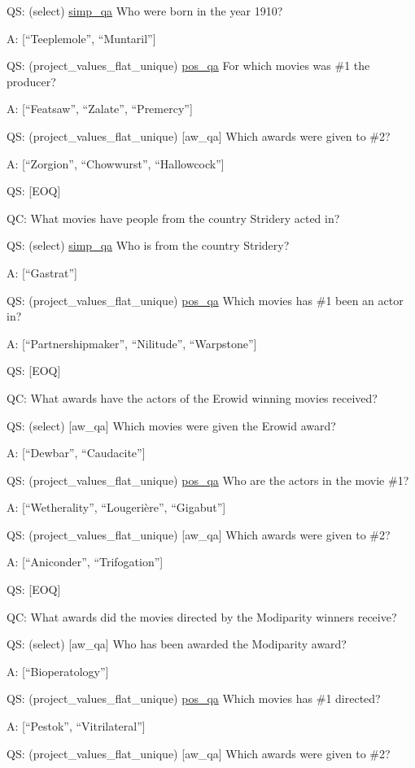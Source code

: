 \documentclass[
]{article}
\begin{document}
QS: (select) \hyperref[simp_qa]{simp\_qa} Who were born in the year
1910?

A: {[}``Teeplemole'', ``Muntaril''{]}

QS: (project\_values\_flat\_unique) \hyperref[pos_qa]{pos\_qa} For which
movies was \#1 the producer?

A: {[}``Featsaw'', ``Zalate'', ``Premercy''{]}

QS: (project\_values\_flat\_unique) {[}aw\_qa{]} Which awards were given
to \#2?

A: {[}``Zorgion'', ``Chowwurst'', ``Hallowcock''{]}

QS: {[}EOQ{]}

QC: What movies have people from the country Stridery acted in?

QS: (select) \hyperref[simp_qa]{simp\_qa} Who is from the country
Stridery?

A: {[}``Gastrat''{]}

QS: (project\_values\_flat\_unique) \hyperref[pos_qa]{pos\_qa} Which
movies has \#1 been an actor in?

A: {[}``Partnershipmaker'', ``Nilitude'', ``Warpstone''{]}

QS: {[}EOQ{]}

QC: What awards have the actors of the Erowid winning movies received?

QS: (select) {[}aw\_qa{]} Which movies were given the Erowid award?

A: {[}``Dewbar'', ``Caudacite''{]}

QS: (project\_values\_flat\_unique) \hyperref[pos_qa]{pos\_qa} Who are
the actors in the movie \#1?

A: {[}``Wetherality'', ``Lougerière'', ``Gigabut''{]}

QS: (project\_values\_flat\_unique) {[}aw\_qa{]} Which awards were given
to \#2?

A: {[}``Aniconder'', ``Trifogation''{]}

QS: {[}EOQ{]}

QC: What awards did the movies directed by the Modiparity winners
receive?

QS: (select) {[}aw\_qa{]} Who has been awarded the Modiparity award?

A: {[}``Bioperatology''{]}

QS: (project\_values\_flat\_unique) \hyperref[pos_qa]{pos\_qa} Which
movies has \#1 directed?

A: {[}``Pestok'', ``Vitrilateral''{]}

QS: (project\_values\_flat\_unique) {[}aw\_qa{]} Which awards were given
to \#2?
\end{document}
